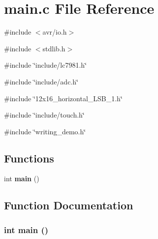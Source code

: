 \section{main.c File Reference}
\label{main_8c}
{\ttfamily \#include $<$avr/io.h$>$}\par
{\ttfamily \#include $<$stdlib.h$>$}\par
{\ttfamily \#include \char`\"{}include/lc7981.h\char`\"{}}\par
{\ttfamily \#include \char`\"{}include/adc.h\char`\"{}}\par
{\ttfamily \#include \char`\"{}12x16\_\-horizontal\_\-LSB\_\-1.h\char`\"{}}\par
{\ttfamily \#include \char`\"{}include/touch.h\char`\"{}}\par
{\ttfamily \#include \char`\"{}writing\_\-demo.h\char`\"{}}\par
\subsection*{Functions}
\begin{DoxyCompactItemize}
\item 
int {\bf main} ()
\end{DoxyCompactItemize}


\subsection{Function Documentation}
\subsubsection[{main}]{\setlength{\rightskip}{0pt plus 5cm}int main ()}\label{main_8c_ae66f6b31b5ad750f1fe042a706a4e3d4}
